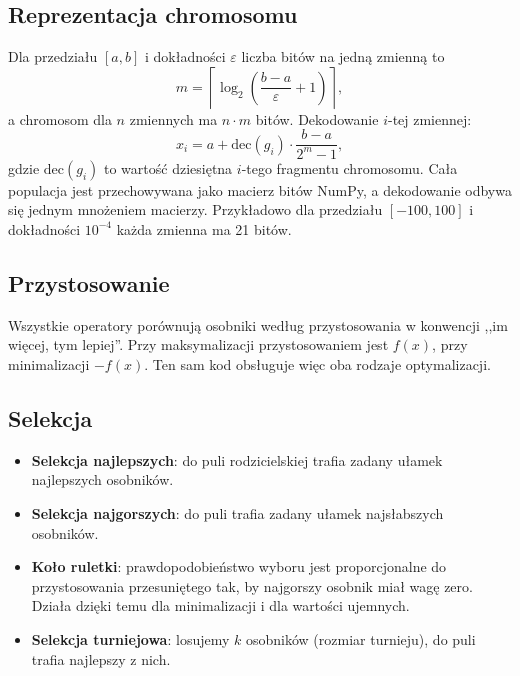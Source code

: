 \documentclass[11pt,a4paper]{article}
\begin{document}
\subsection{Reprezentacja chromosomu}

Dla przedziału $[a, b]$ i dokładności $\varepsilon$ liczba bitów na jedną zmienną to
\[
  m = \left\lceil \log_2\!\left(\frac{b-a}{\varepsilon} + 1\right) \right\rceil ,
\]
a chromosom dla $n$ zmiennych ma $n \cdot m$ bitów. Dekodowanie $i$-tej zmiennej:
\[
  x_i = a + \mathrm{dec}(g_i)\cdot\frac{b-a}{2^m-1},
\]
gdzie $\mathrm{dec}(g_i)$ to wartość dziesiętna $i$-tego fragmentu chromosomu. Cała populacja
jest przechowywana jako macierz bitów NumPy, a dekodowanie odbywa się jednym mnożeniem macierzy.
Przykładowo dla przedziału $[-100, 100]$ i dokładności $10^{-4}$ każda zmienna ma 21 bitów.

\subsection{Przystosowanie}

Wszystkie operatory porównują osobniki według przystosowania w konwencji ,,im więcej, tym lepiej''.
Przy maksymalizacji przystosowaniem jest $f(x)$, przy minimalizacji $-f(x)$. Ten sam kod obsługuje
więc oba rodzaje optymalizacji.

\subsection{Selekcja}
\begin{itemize}
  \item \textbf{Selekcja najlepszych}: do puli rodzicielskiej trafia zadany ułamek najlepszych osobników.
  \item \textbf{Selekcja najgorszych}: do puli trafia zadany ułamek najsłabszych osobników.
  \item \textbf{Koło ruletki}: prawdopodobieństwo wyboru jest proporcjonalne do przystosowania
        przesuniętego tak, by najgorszy osobnik miał wagę zero. Działa dzięki temu dla
        minimalizacji i dla wartości ujemnych.
  \item \textbf{Selekcja turniejowa}: losujemy $k$ osobników (rozmiar turnieju), do puli trafia najlepszy z nich.
\end{itemize}
\end{document}
